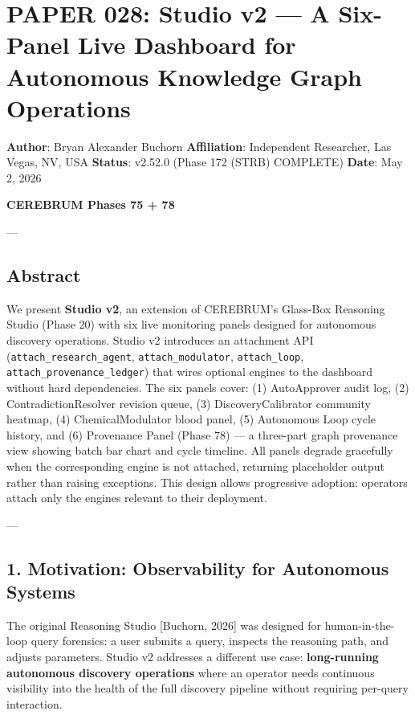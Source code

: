 \section{PAPER 028: Studio v2 — A Six-Panel Live Dashboard for Autonomous Knowledge Graph Operations}

\textbf{Author}: Bryan Alexander Buchorn  
\textbf{Affiliation}: Independent Researcher, Las Vegas, NV, USA  
\textbf{Status}: v2.52.0 (Phase 172 (STRB) COMPLETE)
\textbf{Date}: May 2, 2026

\textbf{CEREBRUM Phases 75 + 78}

---

\subsection{Abstract}

We present \textbf{Studio v2}, an extension of CEREBRUM's Glass-Box Reasoning Studio (Phase 20) with six live monitoring panels designed for autonomous discovery operations. Studio v2 introduces an attachment API (\texttt{attach\_research\_agent}, \texttt{attach\_modulator}, \texttt{attach\_loop}, \texttt{attach\_provenance\_ledger}) that wires optional engines to the dashboard without hard depen\-dencies. The six panels cover: (1) AutoApprover audit log, (2) Contra\-dictionResolver revision queue, (3) DiscoveryCalibrator community heatmap, (4) ChemicalModulator blood panel, (5) Autonomous Loop cycle history, and (6) Provenance Panel (Phase 78) — a three-part graph provenance view showing batch bar chart and cycle timeline. All panels degrade gracefully when the corre\-sponding engine is not attached, returning placeholder output rather than raising exceptions. This design allows progressive adoption: operators attach only the engines relevant to their deployment.

---

\subsection{1. Motivation: Observ\-ability for Autonomous Systems}

The original Reasoning Studio [Buchorn, 2026] was designed for human-in-the-loop query forensics: a user submits a query, inspects the reasoning path, and adjusts parameters. Studio v2 addresses a different use case: \textbf{long-running autonomous discovery operations} where an operator needs continuous visibility into the health of the full discovery pipeline without requiring per-query interaction.

